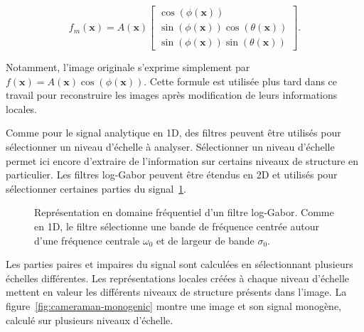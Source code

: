 \begin{equation}
    f_m(\mathbf{x}) = A(\mathbf{x})\left[
        \begin{array}{c}
        \cos(\phi(\mathbf{x})) \\
        \sin(\phi(\mathbf{x}))\cos(\theta(\mathbf{x})) \\
        \sin(\phi(\mathbf{x}))\sin(\theta(\mathbf{x}))
        \end{array}
    \right].
\end{equation}

\noindent Notamment, l'image originale s'exprime simplement par $f(\mathbf{x}) = A(\mathbf{x})\cos(\phi(\mathbf{x}))$. Cette formule est utilisée plus tard dans ce travail pour reconstruire les images après modification de leurs informations locales.

\bigskip

Comme pour le signal analytique en 1D, des filtres peuvent être utilisés pour sélectionner un niveau d'échelle à analyser. Sélectionner un niveau d'échelle permet ici encore d'extraire de l'information sur certains niveaux de structure en particulier. Les filtres log-Gabor peuvent être étendus en 2D et utilisés pour sélectionner certaines parties du signal~\ref{fig:2D-log-gabor}.

\bigskip

\begin{figure}
    \centering

    \caption[Filtre log-Gabor en 2D]{Représentation en domaine fréquentiel d'un filtre log-Gabor. Comme en 1D, le filtre sélectionne une bande de fréquence centrée autour d'une fréquence centrale $\omega_0$ et de largeur de bande $\sigma_0$.}
    \label{fig:2D-log-gabor}
\end{figure}

Les parties paires et impaires du signal sont calculées en sélectionnant plusieurs échelles différentes. Les représentations locales créées à chaque niveau d'échelle mettent en valeur les différents niveaux de structure présents dans l'image. La figure~\ref{fig:cameraman-monogenic} montre une image et son signal monogène, calculé sur plusieurs niveaux d'échelle.

